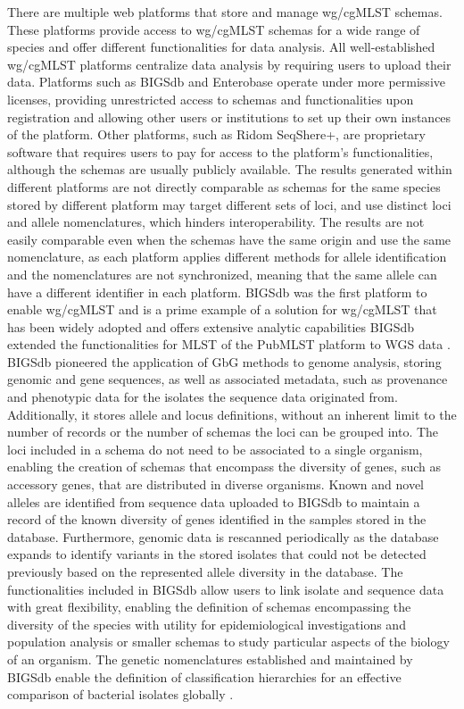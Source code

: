 There are multiple web platforms that store and manage \ac{wg/cgMLST} schemas. These platforms provide access to \ac{wg/cgMLST} schemas for a wide range of species and offer different functionalities for data analysis. All well-established \ac{wg/cgMLST} platforms centralize data analysis by requiring users to upload their data. Platforms such as \ac{BIGSdb} and Enterobase operate under more permissive licenses, providing unrestricted access to schemas and functionalities upon registration and allowing other users or institutions to set up their own instances of the platform. Other platforms, such as Ridom SeqShere+, are proprietary software that requires users to pay for access to the platform's functionalities, although the schemas are usually publicly available. The results generated within different platforms are not directly comparable as schemas for the same species stored by different platform may target different sets of loci, and use distinct loci and allele nomenclatures, which hinders interoperability. The results are not easily comparable even when the schemas have the same origin and use the same nomenclature, as each platform applies different methods for allele identification and the nomenclatures are not synchronized, meaning that the same allele can have a different identifier in each platform. \ac{BIGSdb} was the first platform to enable \ac{wg/cgMLST} and is a prime example of a solution for \ac{wg/cgMLST} that has been widely adopted and offers extensive analytic capabilities \ac{BIGSdb} extended the functionalities for \ac{MLST} of the PubMLST platform to \ac{WGS} data \cite{jolley_bigsdb_2010, jolley_open-access_2018}. \ac{BIGSdb} pioneered the application of \ac{GbG} methods to genome analysis, storing genomic and gene sequences, as well as associated metadata, such as provenance and phenotypic data for the isolates the sequence data originated from. Additionally, it stores allele and locus definitions, without an inherent limit to the number of records or the number of schemas the loci can be grouped into. The loci included in a schema do not need to be associated to a single organism, enabling the creation of schemas that encompass the diversity of genes, such as accessory genes, that are distributed in diverse organisms. Known and novel alleles are identified from sequence data uploaded to \ac{BIGSdb} to maintain a record of the known diversity of genes identified in the samples stored in the database. Furthermore, genomic data is rescanned periodically as the database expands to identify variants in the stored isolates that could not be detected previously based on the represented allele diversity in the database. The functionalities included in \ac{BIGSdb} allow users to link isolate and sequence data with great flexibility, enabling the definition of schemas encompassing the diversity of the species with utility for epidemiological investigations and population analysis or smaller schemas to study particular aspects of the biology of an organism. The genetic nomenclatures established and maintained by \ac{BIGSdb} enable the definition of classification hierarchies for an effective comparison of bacterial isolates globally \cite{jolley_open-access_2018}.

